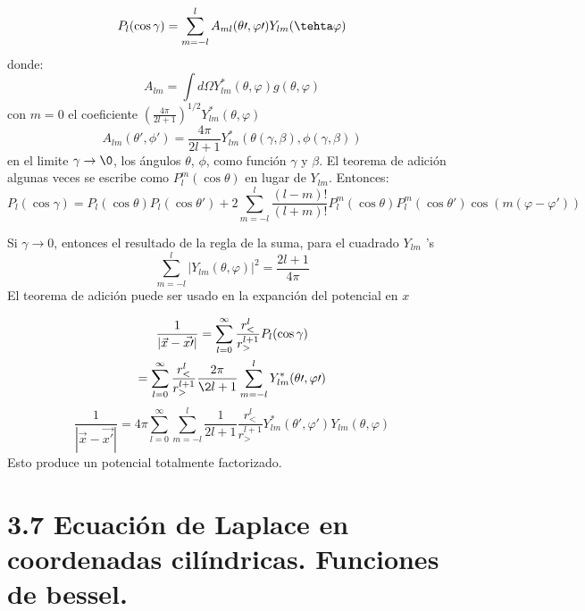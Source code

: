\documentclass{article}
\begin{document}
\begin{equation}
    P_l (\cos \gamma) = \sum_{m = -l}^{l} A_{ml} (\theta\prime, \varphi \prime)Y_{lm}(\tehta \varphi)
\end{equation}
donde:
\begin{equation}
    A_{lm} = \int d\Omega Y_{lm}^{*}(\theta , \varphi)g(\theta, \varphi)
\end{equation}
con $m = 0$ el coeficiente $\left (\frac{4\pi}{2l + 1} \right )^{1/2} Y_{lm}^{*}(\theta, \varphi)$
\begin{equation}
    A_{lm}(\theta \prime, \phi \prime) = \frac{4 \pi }{2l + 1} Y_{lm}^{*} \left ( \theta(\gamma, \beta), \phi (\gamma, \beta) \right )
\end{equation}
en el limite $\gamma \to \0$, los ángulos $\theta$, $\phi$, como función $\gamma$ y $\beta$. El teorema de adición algunas veces se escribe como $P_l^m(\cos \theta)$ en lugar de $Y_{lm}$. Entonces:
\begin{equation}
P_l (\cos \gamma) = P_l(\cos \theta)P_l(\cos \theta\prime) + 2 \sum_{m = -l}^{l} \frac{(l-m)!}{(l+m)!} P_l^{m}(\cos \theta)P_l^{m}(\cos \theta \prime)\cos(m(\varphi - \varphi \prime))    
\end{equation}


Si $\gamma \to 0$, entonces el resultado de la regla de la suma, para el cuadrado $Y_{lm}$ 's 
\begin{equation}
    \sum_{m = -l}^{l} |Y_{lm}(\theta, \varphi)|^2 = \frac{2l + 1}{4\pi}
\end{equation}
El teorema de adición puede ser usado en la expanción del potencial en $x$

\begin{equation}
\begin{gathered}
    \frac{1}{|\vec{x}-\vec{x\prime}|} = \sum_{l = 0}^{\infty}\frac{r_<^{l}}{r_>^{l + 1}} P_l(\cos \gamma) \\
    = \sum_{l = 0}^{\infty} \frac{r_<^{l}}{r_>^{l+1}} \frac{2\pi}{\2l + 1} \sum_{m = -l}^{l} Y_{lm}^{*}(\theta \prime, \varphi \prime)
\end{gathered}
\end{equation}
\begin{equation}
    \frac{1}{|\vec{x} - \vec{x\prime}|} = 4\pi \sum_{l = 0}^{\infty}\sum_{m = -l}^{l} \frac{1}{2l + 1} \frac{r_<^{l}}{r_>^{l+1}} Y_{lm}^{*} (\theta \prime, \varphi \prime) Y_{lm}(\theta, \varphi)
\end{equation}
Esto produce un potencial totalmente factorizado.

\section*{3.7 Ecuación de Laplace en coordenadas cilíndricas. Funciones de bessel.}
\end{document}
